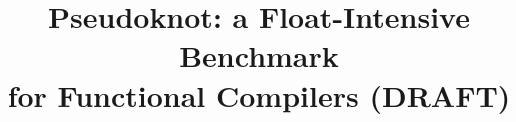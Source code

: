

\newlength{\zerowidth}
\settowidth{\zerowidth}{0}
\newcommand{\z}[0]{\hspace*{\zerowidth}}

\newlength{\dotzerowidth}
\settowidth{\dotzerowidth}{.0}
\newcommand{\dz}[0]{\hspace*{\dotzerowidth}}

\newlength{\dotzerozerowidth}
\settowidth{\dotzerozerowidth}{.00}
\newcommand{\dzz}[0]{\hspace*{\dotzerozerowidth}}

\newcommand{\mm}[1]{\multicolumn{2}{c|}{#1}}
\newcommand{\mmm}[1]{\multicolumn{3}{c|}{#1}}

\newcommand{\sysbigloo}[0]{1}
\newcommand{\syscaml}[0]{2}
\newcommand{\syschalmers}[0]{3}
\newcommand{\sysclean}[0]{4}
\newcommand{\syscmucl}[0]{5}
\newcommand{\syserlang}[0]{6}
\newcommand{\sysfacile}[0]{20}
\newcommand{\sysfast}[0]{7}
\newcommand{\sysgambit}[0]{8}
\newcommand{\sysglasgow}[0]{9}
\newcommand{\sysid}[0]{10}
\newcommand{\sysmlworks}[0]{11}
\newcommand{\sysopal}[0]{12}
\newcommand{\syspolyml}[0]{13}
\newcommand{\syssisals}[0]{14}
\newcommand{\syssisalc}[0]{15}
\newcommand{\syssml}[0]{16}
\newcommand{\sysstoffel}[0]{17}
\newcommand{\systrafola}[0]{18}
\newcommand{\sysfloat}[0]{19}

\textheight 240mm
\addtolength{\topmargin}{-25mm}
\addtolength{\oddsidemargin}{-18mm}
\addtolength{\evensidemargin}{-18mm}
\addtolength{\footheight}{10mm}
\textwidth 160mm



\thispagestyle{empty}

\title{Pseudoknot: a Float-Intensive Benchmark \\ for Functional Compilers (DRAFT)}

